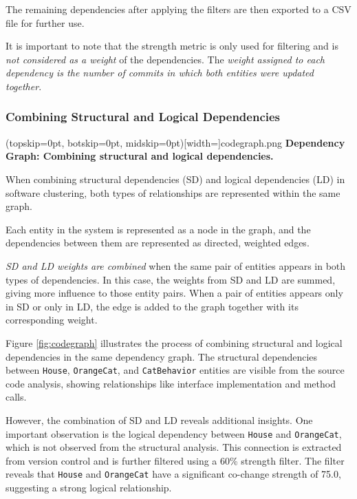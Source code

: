 \documentclass{ieeeaccess}
\begin{document}
The remaining dependencies after applying the filters are then exported to a CSV file for further use.

It is important to note that the strength metric is only used for filtering and is \textit{not considered as a weight} of the dependencies. The \textit{weight assigned to each dependency is the number of commits in which both entities were updated together}.


\subsubsection{Combining Structural and Logical Dependencies}

\Figure[t!](topskip=0pt, botskip=0pt, midskip=0pt)[width=\textwidth]{codegraph.png}
{ \textbf{Dependency Graph: Combining structural and logical dependencies.}\label{fig:codegraph}}

When combining structural dependencies (SD) and logical dependencies (LD) in software clustering, both types of relationships are represented within the same graph.

Each entity in the system is represented as a node in the graph, and the dependencies between them are represented as directed, weighted edges.

\textit{SD and LD weights are combined} when the same pair of entities appears in both types of dependencies. In this case, the weights from SD and LD are summed, giving more influence to those entity pairs. When a pair of entities appears only in SD or only in LD, the edge is added to the graph together with its corresponding weight.

Figure \ref{fig:codegraph} illustrates the process of combining structural and logical dependencies in the same dependency graph. The structural dependencies between \texttt{House}, \texttt{OrangeCat}, and \texttt{CatBehavior} entities are visible from the source code analysis, showing relationships like interface implementation and method calls.

However, the combination of SD and LD reveals additional insights. One important observation is the logical dependency between \texttt{House} and \texttt{OrangeCat}, which is not observed from the structural analysis. This connection is extracted from version control and is further filtered using a 60\% strength filter. The filter reveals that \texttt{House} and \texttt{OrangeCat} have a significant co-change strength of 75.0, suggesting a strong logical relationship.
\end{document}
